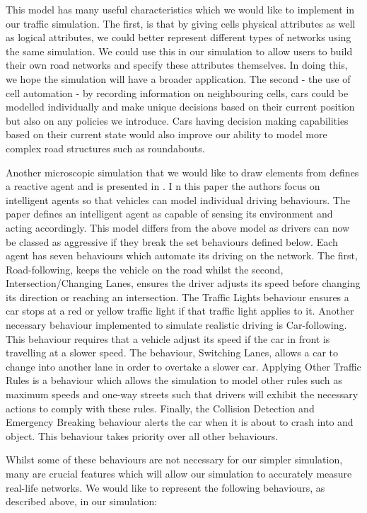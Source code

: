 \documentclass{article}
\begin{document}
	This model has many useful characteristics which we would like to implement in our traffic simulation. The first, is that by giving cells physical attributes as well as logical attributes, we could better represent different types of networks using the same simulation. 
	We could use this in our simulation to allow users to build their own road networks and specify these attributes themselves. In doing this, we hope the simulation will have a broader application. 
	The second - the use of cell automation - by recording information on neighbouring cells, cars could be modelled individually and make unique decisions based on their current position but also on any policies we introduce. 
	Cars having decision making capabilities based on their current state would also improve our ability to model more complex road structures such as roundabouts.  
	
	Another microscopic simulation that we would like to draw elements from defines a reactive agent and is presented in \cite{ehlert2001microscopic}. I
	n this paper the authors focus on intelligent agents so that vehicles can model individual driving behaviours. 
	The paper defines an intelligent agent as capable of sensing its environment and acting accordingly. This model differs from the above model as drivers can now be classed as aggressive if they break the set behaviours defined below. 
	Each agent has seven behaviours which automate its driving on the network. 
	The first, Road-following, keeps the vehicle on the road whilst the second, Intersection/Changing Lanes, ensures the driver adjusts its speed before changing its direction or reaching an intersection. 
	The Traffic Lights behaviour ensures a car stops at a red or yellow traffic light if that traffic light applies to it.  
	Another necessary behaviour implemented to simulate realistic driving is Car-following. 
	This behaviour requires that a vehicle adjust its speed if the car in front is travelling at a slower speed. 
	The behaviour, Switching Lanes, allows a car to change into another lane in order to overtake a slower car. 
	Applying Other Traffic Rules is a behaviour which allows the simulation to model other rules such as maximum speeds and one-way streets such that drivers will exhibit the necessary actions to comply with these rules. 
	Finally, the Collision Detection and Emergency Breaking behaviour alerts the car when it is about to crash into and object. 
	This behaviour takes priority over all other behaviours. 
	
	Whilst some of these behaviours are not necessary for our simpler simulation, many are crucial features which will allow our simulation to accurately measure real-life networks. 
	We would like to represent the following behaviours, as described above, in our simulation: 
	
\end{document}
